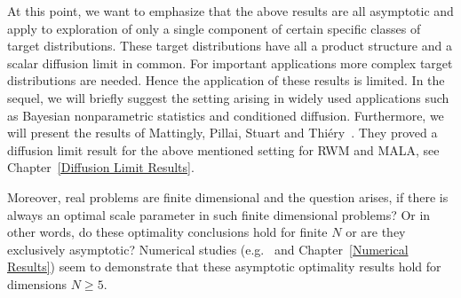 At this point, we want to emphasize that the above results are all asymptotic and apply to exploration of only a single component of certain specific classes of target distributions. These target distributions have all a product structure and a scalar diffusion limit in common. For important applications  more complex target distributions are needed. Hence the application of these results is limited. In the sequel, we will briefly suggest the setting arising in widely used applications such as Bayesian nonparametric statistics and conditioned diffusion. Furthermore, we will present the results of Mattingly, Pillai, Stuart and Thi\'{e}ry~\autocite{Mattingly2010, Pillai2012}. They proved a diffusion limit result for the above mentioned setting for RWM and MALA, see Chapter~\ref{Diffusion Limit Results}.

Moreover, real problems are finite dimensional and the question arises, if there is always an optimal scale parameter in such finite dimensional problems? Or in other words, do these optimality conclusions hold for finite $N$ or are they exclusively asymptotic? Numerical studies (e.g.~\autocite{Gelman1996, Roberts2001} and Chapter~\ref{Numerical Results}) seem to demonstrate that these asymptotic optimality results hold for dimensions $N \geq 5 $. 






